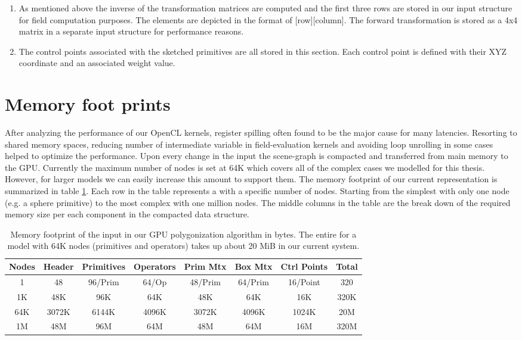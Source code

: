 \begin{enumerate}
 
 \item As mentioned above the inverse of the transformation matrices are computed and the first three rows are stored in our input 
 structure for field computation purposes. The elements are depicted in the format of [row][column]. The forward transformation is 
 stored as a 4x4 matrix in a separate input structure for performance reasons. 
 
 \item The control points associated with the sketched primitives are all stored in this section. Each control point is defined with 
 their XYZ coordinate and an associated weight value. 
\end{enumerate}

\section{Memory foot prints}\label{sec:memory}
After analyzing the performance of our OpenCL kernels, register spilling often found to be the major cause for many latencies. Resorting to shared memory spaces, reducing 
number of intermediate variable in field-evaluation kernels and avoiding loop unrolling in some cases helped to optimize the performance. Upon every
change in the input \blob the scene-graph is compacted and transferred from main memory to the GPU. Currently the maximum number of nodes is set at 64K which covers
all of the complex cases we modelled for this thesis. However, for larger \blob models  we can easily increase this amount to support them. The memory footprint of 
our current \blob representation is summarized in table \ref{table:memfootprint}. Each row in the table represents a \blob with a specific number of nodes.
Starting from the simplest \blob with only one node (e.g. a sphere primitive) to the most complex \blob with one million nodes. The middle columns in the 
table are the break down of the required memory size per each component in the compacted \blob data structure.

\begin{table}[H]
\begin{center}
	 \caption{\label{table:memfootprint}
  {Memory footprint of the input \blob in our GPU polygonization algorithm in bytes. The entire \blob for a model with 64K nodes (primitives and operators) 
  takes up about 20 MiB in our current system.}
}
  \begin{tabular}{ | c | c | c | c | c | c | c | c |}
    \hline    
    Nodes & Header & Primitives & Operators & Prim Mtx & Box Mtx & Ctrl Points & Total \\ \hline \hline
    1 & 48 & 96/Prim & 64/Op & 48/Prim & 64/Prim & 16/Point & 320 \\ \hline
    1K & 48K & 96K & 64K & 48K & 64K & 16K & 320K \\ \hline
    64K & 3072K & 6144K & 4096K & 3072K & 4096K & 1024K & 20M \\ \hline
    1M & 48M & 96M & 64M & 48M & 64M & 16M & 320M \\ 
    \hline
  	\end{tabular}
\end{center}
\end{table}


